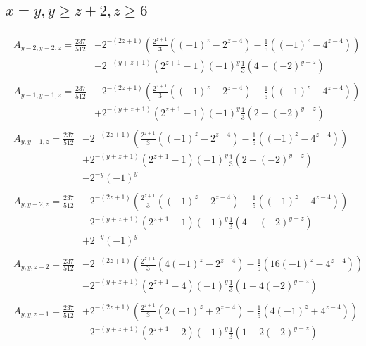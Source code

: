 \newpage
\subsection*{$x=y,y\ge z+2,z\ge6$}
\begin{align*}
\begin{split}
A_{y-2,y-2,z}=\frac{237}{512} &-2^{-(2z+1)}\left(\frac{2^{z+1}}{3}\left((-1)^z-2^{z-4}\right)-\frac{1}{5}\left((-1)^z-4^{z-4}\right)\right)\\
& -2^{-(y+z+1)}\left(2^{z+1}-1\right)(-1)^y\frac{1}{3}\left(4-(-2)^{y-z}\right)
\end{split}\\
\begin{split}
A_{y-1,y-1,z}=\frac{237}{512} &-2^{-(2z+1)}\left(\frac{2^{z+1}}{3}\left((-1)^z-2^{z-4}\right)-\frac{1}{5}\left((-1)^z-4^{z-4}\right)\right)\\
& +2^{-(y+z+1)}\left(2^{z+1}-1\right)(-1)^y\frac{1}{3}\left(2+(-2)^{y-z}\right)
\end{split}\\
\begin{split}
A_{y,y-1,z}=\frac{237}{512} &-2^{-(2z+1)}\left(\frac{2^{z+1}}{3}\left((-1)^z-2^{z-4}\right)-\frac{1}{5}\left((-1)^z-4^{z-4}\right)\right)\\
& +2^{-(y+z+1)}\left(2^{z+1}-1\right)(-1)^y\frac{1}{3}\left(2+(-2)^{y-z}\right)\\
& -2^{-y}(-1)^y
\end{split}\\
\begin{split}
A_{y,y-2,z}=\frac{237}{512} &-2^{-(2z+1)}\left(\frac{2^{z+1}}{3}\left((-1)^z-2^{z-4}\right)-\frac{1}{5}\left((-1)^z-4^{z-4}\right)\right)\\
& -2^{-(y+z+1)}\left(2^{z+1}-1\right)(-1)^y\frac{1}{3}\left(4-(-2)^{y-z}\right)\\
& +2^{-y}(-1)^y
\end{split}\\
\begin{split}
A_{y,y,z-2}=\frac{237}{512} &-2^{-(2z+1)}\left(\frac{2^{z+1}}{3}\left(4(-1)^z-2^{z-4}\right)-\frac{1}{5}\left(16(-1)^z-4^{z-4}\right)\right)\\
& -2^{-(y+z+1)}\left(2^{z+1}-4\right)(-1)^y\frac{1}{3}\left(1-4(-2)^{y-z}\right)
\end{split}\\
\begin{split}
A_{y,y,z-1}=\frac{237}{512} &+2^{-(2z+1)}\left(\frac{2^{z+1}}{3}\left(2(-1)^z+2^{z-4}\right)-\frac{1}{5}\left(4(-1)^z+4^{z-4}\right)\right)\\
& -2^{-(y+z+1)}\left(2^{z+1}-2\right)(-1)^y\frac{1}{3}\left(1+2(-2)^{y-z}\right)
\end{split}
\end{align*}

